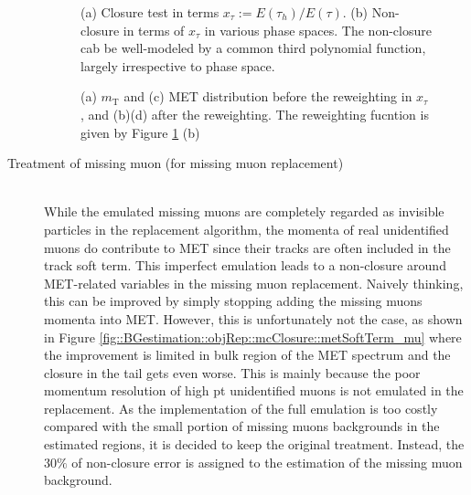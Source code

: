 \begin{description}
\begin{figure}[h]
  \centering
    \caption{ (a) Closure test in terms $x_{\tau} := E(\tau_{h})/E(\tau)$. (b) Non-closure in terms of $x_{\tau}$ in various phase spaces. The non-closure cab be well-modeled by a common third polynomial function, largely irrespective to phase space.
  \label{fig::BGestimation::objRep::mcClosure::rwgt_x} }
\end{figure}

\begin{figure}[h]
  \centering
    \caption{ (a) $m_{\mathrm{T}}$ and (c) MET distribution before the reweighting in $x_{\tau}$, and (b)(d) after the reweighting. The reweighting fucntion is given by Figure \ref{fig::BGestimation::objRep::mcClosure::rwgt_x} (b)  \label{fig::BGestimation::objRep::mcClosure::rwgt_x_mt} }
\end{figure}




\clearpage
\item [Treatment of missing muon (for missing muon replacement)]  \mbox{} \\
While the emulated missing muons are completely regarded as invisible particles in the replacement algorithm, the momenta of real unidentified muons do contribute to MET since their tracks are often included in the track soft term. This imperfect emulation leads to a non-closure around MET-related variables in the missing muon replacement. Naively thinking, this can be improved by simply stopping adding the missing muons momenta into MET. However, this is unfortunately not the case, as shown in Figure \ref{fig::BGestimation::objRep::mcClosure::metSoftTerm_mu} where the improvement is limited in bulk region of the MET spectrum and the closure in the tail gets even worse. This is mainly because the poor momentum resolution of high pt unidentified muons is not emulated in the replacement. As the implementation of the full emulation is too costly compared with the small portion of missing muons backgrounds in the estimated regions, it is decided to keep the original treatment. Instead, the $30\%$ of non-closure error is assigned to the estimation of the missing muon background. \\


\end{description}
